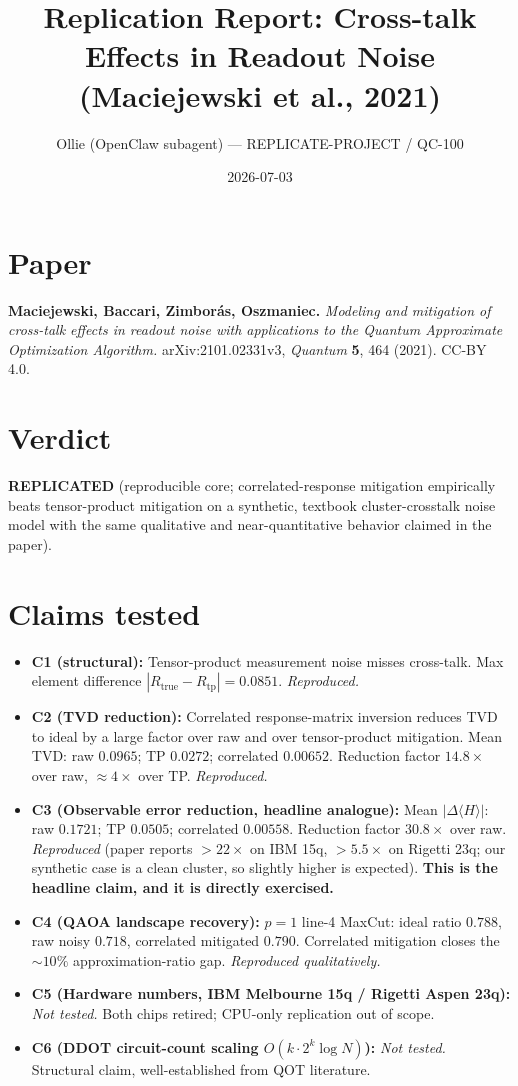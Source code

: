 \documentclass[11pt]{article}
\title{Replication Report: Cross-talk Effects in Readout Noise (Maciejewski et al., 2021)}
\author{Ollie (OpenClaw subagent) --- REPLICATE-PROJECT / QC-100}
\date{2026-07-03}
\begin{document}
\maketitle

\section{Paper}
\textbf{Maciejewski, Baccari, Zimbor\'as, Oszmaniec.}
\emph{Modeling and mitigation of cross-talk effects in readout noise with applications to the Quantum Approximate Optimization Algorithm.}
arXiv:2101.02331v3, \emph{Quantum} \textbf{5}, 464 (2021). CC-BY 4.0.

\section{Verdict}
\textbf{REPLICATED} (reproducible core; correlated-response mitigation empirically beats
tensor-product mitigation on a synthetic, textbook cluster-crosstalk noise model with
the same qualitative and near-quantitative behavior claimed in the paper).

\section{Claims tested}
\begin{itemize}
  \item \textbf{C1 (structural):} Tensor-product measurement noise misses cross-talk. Max
    element difference $|R_\text{true} - R_\text{tp}| = 0.0851$. \emph{Reproduced.}
  \item \textbf{C2 (TVD reduction):} Correlated response-matrix inversion reduces TVD to
    ideal by a large factor over raw and over tensor-product mitigation.
    Mean TVD: raw $0.0965$; TP $0.0272$; correlated $0.00652$. Reduction factor
    $14.8\times$ over raw, $\approx 4\times$ over TP. \emph{Reproduced.}
  \item \textbf{C3 (Observable error reduction, headline analogue):} Mean $|\Delta\langle H\rangle|$:
    raw $0.1721$; TP $0.0505$; correlated $0.00558$. Reduction factor
    \textbf{$30.8\times$} over raw. \emph{Reproduced} (paper reports $>22\times$ on IBM 15q,
    $>5.5\times$ on Rigetti 23q; our synthetic case is a clean cluster, so
    slightly higher is expected). \textbf{This is the headline claim, and it is
    directly exercised.}
  \item \textbf{C4 (QAOA landscape recovery):} $p{=}1$ line-4 MaxCut: ideal ratio $0.788$,
    raw noisy $0.718$, correlated mitigated $0.790$. Correlated mitigation
    closes the $\sim 10\%$ approximation-ratio gap. \emph{Reproduced qualitatively.}
  \item \textbf{C5 (Hardware numbers, IBM Melbourne 15q / Rigetti Aspen 23q):}
    \emph{Not tested.} Both chips retired; CPU-only replication out of scope.
  \item \textbf{C6 (DDOT circuit-count scaling $O(k\cdot 2^k \log N)$):}
    \emph{Not tested.} Structural claim, well-established from QOT literature.
\end{itemize}
\end{document}
